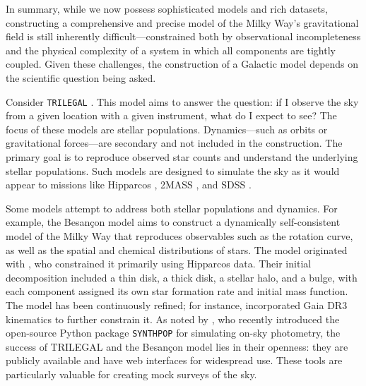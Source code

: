        In summary, while we now possess sophisticated models and rich datasets, constructing a comprehensive and precise model of the Milky Way's gravitational field is still inherently difficult—constrained both by observational incompleteness and the physical complexity of a system in which all components are tightly coupled. Given these challenges, the construction of a Galactic model depends on the scientific question being asked.

        Consider \texttt{TRILEGAL} \citep{2005A&A...436..895G}. This model aims to answer the question: if I observe the sky from a given location with a given instrument, what do I expect to see? The focus of these models are stellar populations. Dynamics—such as orbits or gravitational forces—are secondary and not included in the construction. The primary goal is to reproduce observed star counts and understand the underlying stellar populations. Such models are designed to simulate the sky as it would appear to missions like Hipparcos \citep{1997A&A...323L..49P}, 2MASS \citep{2006AJ....131.1163S}, and SDSS \citep{2000AJ....120.1579Y}.

        Some models attempt to address both stellar populations and dynamics. For example, the Besançon model aims to construct a dynamically self-consistent model of the Milky Way that reproduces observables such as the rotation curve, as well as the spatial and chemical distributions of stars. The model originated with \citet{2003A&A...409..523R}, who constrained it primarily using Hipparcos data. Their initial decomposition included a thin disk, a thick disk, a stellar halo, and a bulge, with each component assigned its own star formation rate and initial mass function. The model has been continuously refined; for instance, \citet{2022A&A...667A..98R} incorporated Gaia DR3 kinematics to further constrain it. As noted by \citet{2025AJ....169..317K}, who recently introduced the open-source Python package \texttt{SYNTHPOP} for simulating on-sky photometry, the success of TRILEGAL and the Besançon model lies in their openness: they are publicly available and have web interfaces for widespread use. These tools are particularly valuable for creating mock surveys of the sky.


